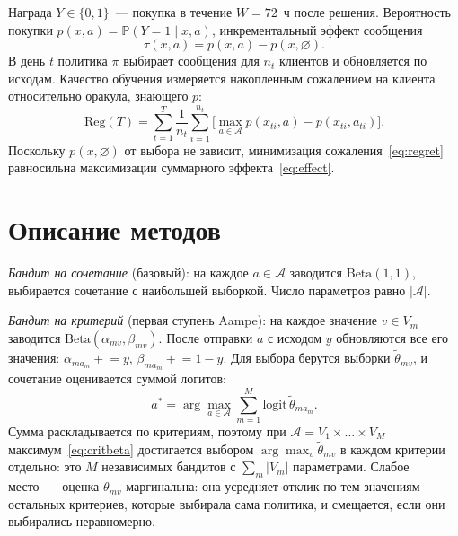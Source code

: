 \documentclass{misisarticle}
\begin{document}
Награда $Y \in \{0, 1\}$~--- покупка в течение $W = 72$~ч после решения. Вероятность покупки $p(x, a) = \mathbb{P}(Y = 1 \mid x, a)$, инкрементальный эффект сообщения
\begin{equation}
  \tau(x, a) = p(x, a) - p(x, \varnothing).
  \label{eq:effect}
\end{equation}
В день $t$ политика $\pi$ выбирает сообщения для $n_t$ клиентов и обновляется по исходам. Качество обучения измеряется накопленным сожалением на клиента относительно оракула, знающего $p$:
\begin{equation}
  \mathrm{Reg}(T) = \sum_{t=1}^{T} \frac{1}{n_t} \sum_{i=1}^{n_t} \Big[\max_{a \in \mathcal{A}} p(x_{ti}, a) - p(x_{ti}, a_{ti})\Big].
  \label{eq:regret}
\end{equation}
Поскольку $p(x, \varnothing)$ от выбора не зависит, минимизация сожаления~\eqref{eq:regret} равносильна максимизации суммарного эффекта~\eqref{eq:effect}.

\section{Описание методов}
\label{sec:methods}

\textit{Бандит на сочетание} (базовый): на каждое $a \in \mathcal{A}$ заводится $\mathrm{Beta}(1, 1)$, выбирается сочетание с наибольшей выборкой. Число параметров равно $|\mathcal{A}|$.

\textit{Бандит на критерий} (первая ступень Aampe): на каждое значение $v \in V_m$ заводится $\mathrm{Beta}(\alpha_{mv}, \beta_{mv})$. После отправки $a$ с исходом $y$ обновляются все его значения: $\alpha_{m a_m} \mathrel{+}= y$, $\beta_{m a_m} \mathrel{+}= 1 - y$. Для выбора берутся выборки $\tilde\theta_{mv}$, и сочетание оценивается суммой логитов:
\begin{equation}
  a^{*} = \arg\max_{a \in \mathcal{A}} \sum_{m=1}^{M} \mathrm{logit}\,\tilde\theta_{m a_m}.
  \label{eq:critbeta}
\end{equation}
Сумма раскладывается по критериям, поэтому при $\mathcal{A} = V_1 \times \dots \times V_M$ максимум~\eqref{eq:critbeta} достигается выбором $\arg\max_v \tilde\theta_{mv}$ в каждом критерии отдельно: это $M$ независимых бандитов с $\sum_m |V_m|$ параметрами. Слабое место~--- оценка $\theta_{mv}$ маргинальна: она усредняет отклик по тем значениям остальных критериев, которые выбирала сама политика, и смещается, если они выбирались неравномерно.
\end{document}
